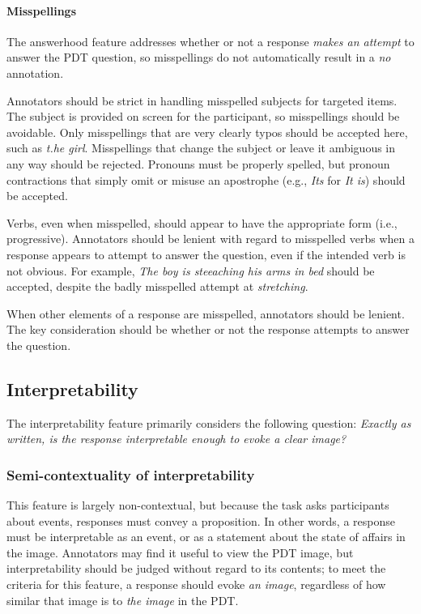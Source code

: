 \documentclass[12pt,notitlepage]{article}
\begin{document}
\paragraph{Misspellings}
\label{para:answerhood-misspellings}
The answerhood feature addresses whether or not a response \textit{makes an attempt} to answer the PDT question, so misspellings do not automatically result in a \textit{no} annotation. 

Annotators should be strict in handling misspelled subjects for targeted items. The subject is provided on screen for the participant, so misspellings should be avoidable. Only misspellings that are very clearly typos should be accepted here, such as \textit{t.he girl}. Misspellings that change the subject or leave it ambiguous in any way should be rejected. Pronouns must be properly spelled, but pronoun contractions that simply omit or misuse an apostrophe (e.g., \textit{Its} for \textit{It is}) should be accepted.

Verbs, even when misspelled, should appear to have the appropriate form (i.e., progressive). Annotators should be lenient with regard to misspelled verbs when a response appears to attempt to answer the question, even if the intended verb is not obvious. For example, \textit{The boy is steeaching his arms in bed} should be accepted, despite the badly misspelled attempt at \textit{stretching}.

When other elements of a response are misspelled, annotators should be lenient. The key consideration should be whether or not the response attempts to answer the question.

\subsection{Interpretability} \label{subsec:interpretability}
The interpretability feature primarily considers the following question: \textit{Exactly as written, is the response interpretable enough to evoke a clear image?} 

\subsubsection{Semi-contextuality of interpretability} \label{subsubsec:semicontext-interp} This feature is largely non-contextual, but because the task asks participants about events, responses must convey a proposition. In other words, a response must be interpretable as an event, or as a statement about the state of affairs in the image. Annotators may find it useful to view the PDT image, but interpretability should be judged without regard to its contents; to meet the criteria for this feature, a response should evoke \textit{an image}, regardless of how similar that image is to \textit{the image} in the PDT.
\end{document}
